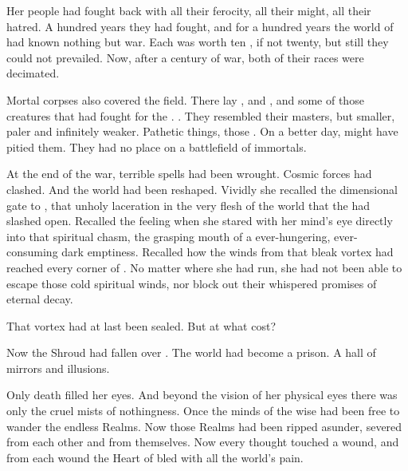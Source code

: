 
Her people had fought back with all their ferocity, all their might, all their hatred. 
A hundred years they had fought, and for a hundred years the world of \Miith{} had known nothing but war. 
Each \dragon{} was worth ten \resphain{}, if not twenty, but still they could not prevailed. 
Now, after a century of war, both of their races were decimated. 

Mortal corpses also covered the field. 
There lay , and , and some of those creatures that had fought for the \resphain. 
. 
They resembled their \resphan{} masters, but smaller, paler and infinitely weaker. 
Pathetic things, those \humans. 
On a better day, \Cryocas{} might have pitied them. 
They had no place on a battlefield of immortals. 



At the end of the war, terrible spells had been wrought. 
Cosmic forces had clashed. 
And the world had been reshaped. 
Vividly she recalled the dimensional gate to , that unholy laceration in the very flesh of the world that the \resphain{} had slashed open. 
Recalled the feeling when she stared with her mind's eye directly into that spiritual chasm, the grasping mouth of a ever-hungering, ever-consuming dark emptiness. 
Recalled how the winds from that bleak vortex had reached every corner of \Miith{}.
No matter where she had run, she had not been able to escape those cold spiritual winds, nor block out their whispered promises of eternal decay. 

That vortex had at last been sealed. 
But at what cost? 

Now the Shroud had fallen over \Miith{}. 
The world had become a prison. 
A hall of mirrors and illusions. 

Only death filled her eyes. 
And beyond the vision of her physical eyes there was only the cruel mists of nothingness. 
Once the minds of the wise had been free to wander the endless Realms. 
Now those Realms had been ripped asunder, severed from each other and from themselves. 
Now every thought touched a wound, and from each wound the Heart of \Miith{} bled with all the world's pain. 

